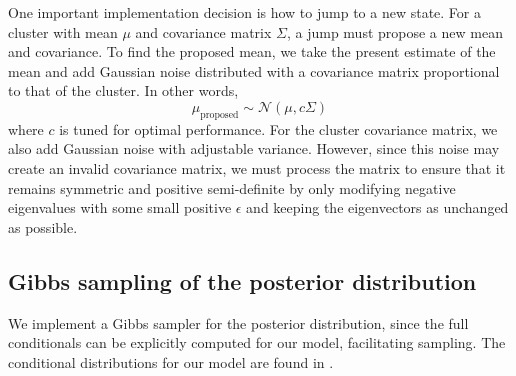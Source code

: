 \documentclass[twoside]{article}
\theoremstyle{theorem}
\theoremstyle{theorem}
\theoremstyle{theorem}
\theoremstyle{lemma}
\theoremstyle{definition}
\theoremstyle{example}
\begin{document}
One important implementation decision is how to jump to a new state. For a cluster with mean $\mu$ and covariance matrix $\Sigma$, a jump must propose a new mean and covariance. To find the proposed mean, we take the present estimate of the mean and add Gaussian noise distributed with a covariance matrix proportional to that of the cluster. In other words,
$$\mu_\text{proposed} \sim \mathcal{N}(\mu, c\Sigma)$$
where $c$ is tuned for optimal performance. For the cluster covariance matrix, we also add Gaussian noise with adjustable variance. However, since this noise may create an invalid covariance matrix, we must process the matrix to ensure that it remains symmetric and positive semi-definite by only modifying negative eigenvalues with some small positive $\epsilon$ and keeping the eigenvectors as unchanged as possible.

\subsection{Gibbs sampling of the posterior distribution}
We implement a Gibbs sampler for the posterior distribution, since the full conditionals can be explicitly computed for our model, facilitating sampling.  The conditional distributions for our model are found in \cite{Gelman, Jones}. 
\end{document}
